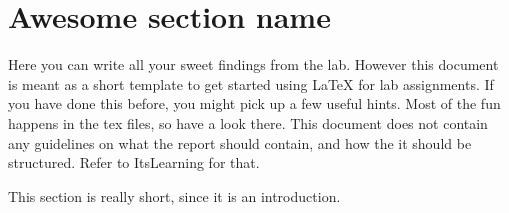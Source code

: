 \section{Awesome section name}
Here you can write all your sweet findings from the lab. However this document is meant as a short template to get started using \LaTeX{} for lab assignments. If you have done this before, you might pick up a few useful hints. Most of the fun happens in the tex files, so have a look there. This document does not contain any guidelines on what the report should contain, and how the it should be structured. Refer to ItsLearning for that.

This section is really short, since it is an introduction.
